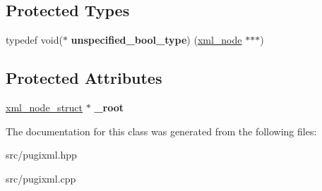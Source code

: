 \subsection*{Protected Types}
\begin{DoxyCompactItemize}
\item 
\mbox{\label{classpugi_1_1xml__node_a83fe32b933530b244865ee401b08b037}} 
typedef void($\ast$ {\bfseries unspecified\+\_\+bool\+\_\+type}) (\hyperlink{classpugi_1_1xml__node}{xml\+\_\+node} $\ast$$\ast$$\ast$)
\end{DoxyCompactItemize}
\subsection*{Protected Attributes}
\begin{DoxyCompactItemize}
\item 
\mbox{\label{classpugi_1_1xml__node_a45a5b342de1e37a60565f7693f03cc08}} 
\hyperlink{structpugi_1_1xml__node__struct}{xml\+\_\+node\+\_\+struct} $\ast$ {\bfseries \+\_\+root}
\end{DoxyCompactItemize}


The documentation for this class was generated from the following files\+:\begin{DoxyCompactItemize}
\item 
src/pugixml.\+hpp\item 
src/pugixml.\+cpp\end{DoxyCompactItemize}

